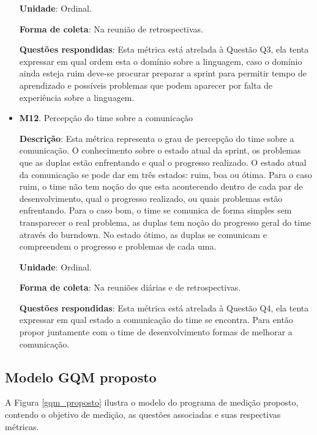 \begin{itemize}
	   \subitem \textbf{Unidade}: Ordinal. 
	   
	   \subitem \textbf{Forma de coleta}: Na reunião de retrospectivas.
	   
	   \subitem \textbf{Questões respondidas}: Esta métrica está atrelada à Questão Q3, ela tenta expressar em 
	   qual ordem esta o domínio sobre a linguagem, caso o domínio ainda esteja ruim deve-se procurar preparar a 
	   sprint para permitir tempo de aprendizado e possíveis problemas que podem aparecer por falta de experiência 
	   sobre a linguagem.
	
	 \item \textbf{M12}. Percepção do time sobre a comunicação
	 
	    \subitem \textbf{Descrição}: Esta métrica representa o grau de percepção do time sobre a comunicação. O
	     conhecimento sobre o estado atual da sprint, os problemas que as duplas estão enfrentando e qual o
	      progresso realizado. O estado atual da comunicação se pode dar em três estados: ruim, boa ou ótima. Para
	       o caso ruim, o time não tem noção do que esta acontecendo dentro de cada par de desenvolvimento, qual o
	        progresso realizado, ou quais problemas estão enfrentando. Para o caso bom, o time se comunica de
	         forma simples sem transparecer o real problema, as duplas tem noção do progresso geral do time
	          através do burndown. No estado ótimo, as duplas se comunicam e compreendem o progresso e problemas
	           de cada uma.
	   
	   \subitem \textbf{Unidade}: Ordinal. 
	   
	   \subitem \textbf{Forma de coleta}: Na reuniões diárias e de retrospectivas.
	   
	   \subitem \textbf{Questões respondidas}: Esta métrica está atrelada à Questão Q4, ela tenta expressar em
	    qual estado a comunicação do time se encontra. Para então propor juntamente com o time de desenvolvimento
	     formas de melhorar a comunicação.
		    
	\end{itemize}
	
      \vfill
      \pagebreak
      \subsection{Modelo GQM proposto}
      
	A Figura \ref{gqm_proposto} ilustra o modelo do programa de medição proposto, contendo o objetivo de medição, as 
	questões associadas e suas respectivas métricas.
	
